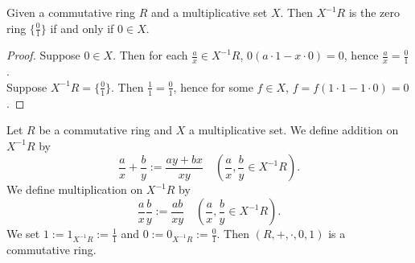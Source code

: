     \begin{lemma}
        Given a commutative ring $R$ and a multiplicative set $X$. Then $X^{-1}R$ is the zero ring $\{\frac{0}{1}\}$ if and only if $0\in X$.
    \end{lemma}
    \begin{proof}
        Suppose $0\in X$. Then for each $\frac{a}{x}\in X^{-1}R$, $0(a\cdot 1-x\cdot 0)=0$, hence $\frac{a}{x}=\frac{0}{1}$.\\
        Suppose $X^{-1}R=\{\frac{0}{1}\}$. Then $\frac{1}{1}=\frac{0}{1}$, hence for some $f\in X$, $f =f(1\cdot 1-1\cdot 0)=0$.     
    \end{proof}
    \begin{lemma}
        Let $R$ be a commutative ring and $X$ a multiplicative set. We define addition on $X^{-1}R$ by
        $$
            \frac{a}{x}+\frac{b}{y} := \frac{ay+bx}{xy}\quad \left(\frac{a}{x},\frac{b}{y}\in X^{-1}R\right).
        $$
        We define multiplication on $X^{-1}R$ by 
        $$
            \frac{a}{x}\frac{b}{y} := \frac{ab}{xy} \quad \left(\frac{a}{x},\frac{b}{y}\in X^{-1}R\right).
        $$
        We set $1 := 1_{X^{-1}R}:= \frac{1}{1}$ and $0 := 0_{X^{-1}R}:= \frac{0}{1}$. Then $(R,+,\cdot,0,1)$ is a commutative ring.  
    \end{lemma}
